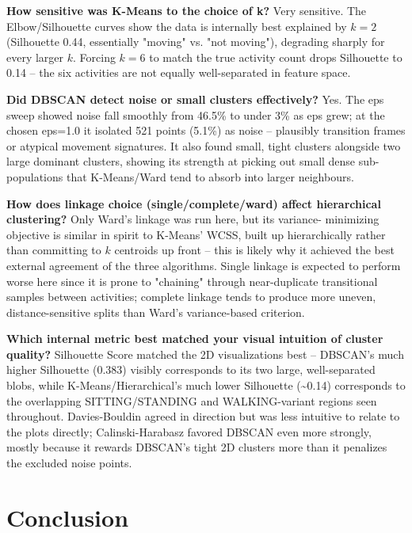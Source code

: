 \documentclass[12pt,a4paper]{article}
\begin{document}
\textbf{How sensitive was K-Means to the choice of k?} Very sensitive. The
Elbow/Silhouette curves show the data is internally best explained by
\(k=2\) (Silhouette 0.44, essentially "moving" vs. "not moving"),
degrading sharply for every larger \(k\). Forcing \(k=6\) to match the true
activity count drops Silhouette to 0.14 -- the six activities are not
equally well-separated in feature space.

\textbf{Did DBSCAN detect noise or small clusters effectively?} Yes. The eps
sweep showed noise fall smoothly from 46.5\% to under 3\% as eps grew; at
the chosen eps=1.0 it isolated 521 points (5.1\%) as noise -- plausibly
transition frames or atypical movement signatures. It also found small,
tight clusters alongside two large dominant clusters, showing its
strength at picking out small dense sub-populations that K-Means/Ward
tend to absorb into larger neighbours.

\textbf{How does linkage choice (single/complete/ward) affect hierarchical
clustering?} Only Ward's linkage was run here, but its variance-
minimizing objective is similar in spirit to K-Means' WCSS, built up
hierarchically rather than committing to \(k\) centroids up front -- this
is likely why it achieved the best external agreement of the three
algorithms. Single linkage is expected to perform worse here since it is
prone to "chaining" through near-duplicate transitional samples between
activities; complete linkage tends to produce more uneven,
distance-sensitive splits than Ward's variance-based criterion.

\textbf{Which internal metric best matched your visual intuition of cluster
quality?} Silhouette Score matched the 2D visualizations best -- DBSCAN's
much higher Silhouette (0.383) visibly corresponds to its two large,
well-separated blobs, while K-Means/Hierarchical's much lower Silhouette
(\textasciitilde{}0.14) corresponds to the overlapping SITTING/STANDING and
WALKING-variant regions seen throughout. Davies-Bouldin agreed in
direction but was less intuitive to relate to the plots directly;
Calinski-Harabasz favored DBSCAN even more strongly, mostly because it
rewards DBSCAN's tight 2D clusters more than it penalizes the excluded
noise points.

\section{Conclusion}
\label{sec:orgb8598a0}
\end{document}
